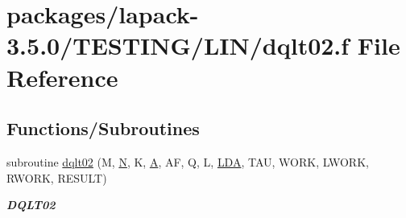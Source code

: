 \hypertarget{dqlt02_8f}{}\section{packages/lapack-\/3.5.0/\+T\+E\+S\+T\+I\+N\+G/\+L\+I\+N/dqlt02.f File Reference}
\label{dqlt02_8f}
\subsection*{Functions/\+Subroutines}
\begin{DoxyCompactItemize}
\item 
subroutine \hyperlink{group__double__lin_ga7e213f6864d378b023433585b255b231}{dqlt02} (M, \hyperlink{polmisc_8c_a0240ac851181b84ac374872dc5434ee4}{N}, K, \hyperlink{classA}{A}, A\+F, Q, L, \hyperlink{example__user_8c_ae946da542ce0db94dced19b2ecefd1aa}{L\+D\+A}, T\+A\+U, W\+O\+R\+K, L\+W\+O\+R\+K, R\+W\+O\+R\+K, R\+E\+S\+U\+L\+T)
\begin{DoxyCompactList}\small\item\em {\bfseries D\+Q\+L\+T02} \end{DoxyCompactList}\end{DoxyCompactItemize}
